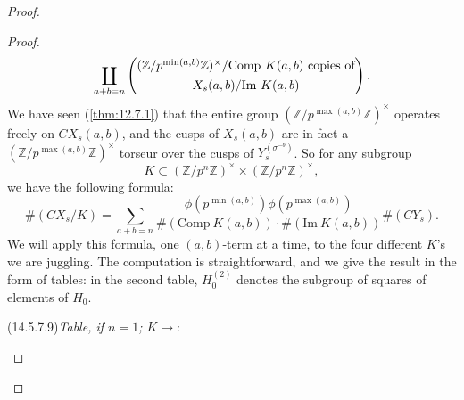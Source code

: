 \begin{proof}
\begin{proof}
\begin{equation}\label{eq:14.5.7.7}
\coprod_{a+b=n} \left( \begin{array}{@{}c@{}} (\mathbb{Z}/p^{\min(a,b)}\mathbb{Z})^\times / \mathrm{Comp}\ K(a,b) \text{ copies of} \\[4pt] X_s(a,b) / \mathrm{Im}\ K(a,b) \end{array} \right) .
\end{equation}
We have seen (\ref{thm:12.7.1}) that the entire group $(\mathbb{Z}/p^{\max(a,b)}\mathbb{Z})^\times$ operates freely on $CX_s(a,b)$, and the cusps of $X_s(a,b)$ are in fact a $(\mathbb{Z}/p^{\max(a,b)}\mathbb{Z})^\times$ torseur over the cusps of $Y_s^{(\sigma^{-b})}$. So for any subgroup
\[
K \subset (\mathbb{Z}/p^n\mathbb{Z})^\times \times (\mathbb{Z}/p^n\mathbb{Z})^\times ,
\]
we have the following formula:
\begin{equation}\label{eq:14.5.7.8}
\#(CX_s / K) = \sum_{a+b=n} \frac{\phi(p^{\min(a,b)}) \phi(p^{\max(a,b)})}{\#(\mathrm{Comp}\ K(a,b)) \cdot \#(\mathrm{Im}\ K(a,b))} \#(CY_s) .
\end{equation}
We will apply this formula, one $(a,b)$-term at a time, to the four different $K$'s we are juggling. The computation is straightforward, and we give the result in the form of tables: in the second table, $H_0^{(2)}$ denotes the subgroup of squares of elements of $H_0$.

\par{}\noindent{}\label{item:14.5.7.9}(14.5.7.9)\enspace \emph{Table, if $n = 1$; $K \to$}:
\begin{center}
\end{center}


\end{proof}
\end{proof}
